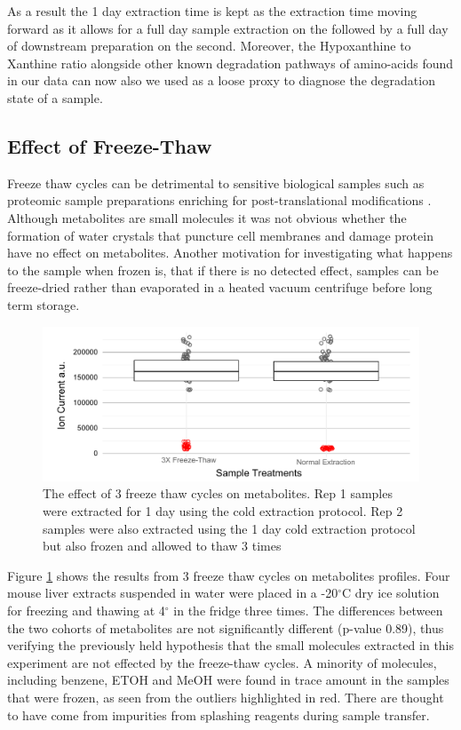 \documentclass[a4paper,11pt,twoside]{book}
\begin{document}
	As a result the 1 day extraction time is kept as the extraction time moving forward as it allows for a full day sample extraction on the followed by a full day of downstream preparation on the second. Moreover, the Hypoxanthine to Xanthine ratio alongside other known degradation pathways of amino-acids \citep{Anton2015PreAnalytical} found in our data can now also we used as a loose proxy to diagnose the degradation state of a sample.
	
	\subsection*{Effect of Freeze-Thaw}
	
	Freeze thaw cycles can be detrimental to sensitive biological samples such as proteomic sample preparations enriching for post-translational modifications \citep{Paltiel2008}. Although metabolites are small molecules  it was not obvious whether the formation of water crystals that puncture cell membranes and damage protein have no effect on metabolites. Another motivation for investigating what happens to the sample when frozen is, that if there is no detected effect, samples can be freeze-dried rather than evaporated in a heated vacuum centrifuge before long term storage.
	
\begin{figure}[th]
	\centering
	\includegraphics[width=1.2\linewidth]{2.Optimizaiton_Figures/Freeze_Thaw}
	\caption{The effect of 3 freeze thaw cycles on metabolites. Rep 1 samples were extracted for 1 day using the cold extraction protocol. Rep 2 samples were also extracted using the 1 day cold extraction protocol but also frozen and allowed to thaw 3 times}
	\label{Boxplots: Effects of Freeze Thaw Cycle}
\end{figure}
	
	Figure \ref{Boxplots: Effects of Freeze Thaw Cycle} shows the results from 3 freeze thaw cycles on metabolites profiles. Four mouse liver extracts suspended in water were placed in a -20$^\circ$C dry ice  solution for freezing and thawing at 4$^\circ$ in the fridge three times. The differences between the two cohorts of metabolites are not significantly different (p-value 0.89), thus verifying the previously held hypothesis that the small molecules extracted in this experiment are not effected by the freeze-thaw cycles. A minority of molecules, including benzene, ETOH and MeOH were found in trace amount in the samples that were frozen, as seen from the outliers highlighted in red. There are thought to have come from impurities from splashing reagents during sample transfer.
	
\end{document}
